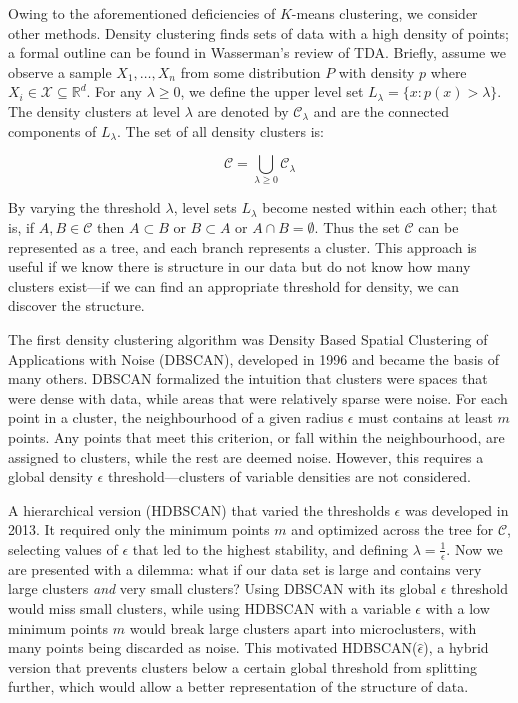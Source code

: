 Owing to the aforementioned deficiencies of $K$-means clustering, we consider other methods. Density clustering finds sets of data with a high density of points; a formal outline can be found in Wasserman's review of TDA\citep{wasserman_topological_2018}. Briefly, assume we observe a sample $X_{1}, \dots , X_{n}$ from some distribution $P$ with density $p$ where $X_{i} \in \mathcal{X} \subseteq \mathbb{R}^d$. For any $\lambda \ge 0$, we define the upper level set $L_{\lambda} = \{x: p(x) > \lambda \}$. The density clusters at level $\lambda$ are denoted by $\mathcal{C}_{\lambda}$ and are the connected components of $L_{\lambda}$. The set of all density clusters is:

$$ \mathcal{C} = \bigcup_{\lambda \ge 0} \mathcal{C}_{\lambda} $$

By varying the threshold $\lambda$, level sets $L_{\lambda}$ become nested within each other; that is, if $A, B \in \mathcal{C}$ then $A \subset B$ or $B \subset A$ or $A \cap B = \emptyset$. Thus the set $\mathcal{C}$ can be represented as a tree, and each branch represents a cluster. This approach is useful if we know there is structure in our data but do not know how many clusters exist---if we can find an appropriate threshold for density, we can discover the structure.

The first density clustering algorithm was Density Based Spatial Clustering of Applications with Noise (DBSCAN), developed in 1996\citep{ester1996density} and became the basis of many others\citep{khan_dbscan_2014}. DBSCAN formalized the intuition that clusters were spaces that were dense with data, while areas that were relatively sparse were noise. For each point in a cluster, the neighbourhood of a given radius $\epsilon$ must contains at least $m$ points. Any points that meet this criterion, or fall within the neighbourhood, are assigned to clusters, while the rest are deemed noise. However, this requires a global density $\epsilon$ threshold---clusters of variable densities are not considered. 

A hierarchical version (HDBSCAN) that varied the thresholds $\epsilon$ was developed in 2013\citep{campello_density-based_2013}. It required only the minimum points $m$ and optimized across the tree for $\mathcal{C}$, selecting values of $\epsilon$ that led to the highest stability, and defining $\lambda = \frac{1}{\epsilon}$. Now we are presented with a dilemma: what if our data set is large and contains very large clusters \emph{and} very small clusters? Using DBSCAN with its global $\epsilon$ threshold would miss small clusters, while using HDBSCAN with a variable $\epsilon$ with a low minimum points $m$ would break large clusters apart into microclusters, with many points being discarded as noise. This motivated HDBSCAN($\hat{\epsilon}$), a hybrid version that prevents clusters below a certain global threshold from splitting further, which would allow a better representation of the structure of data\citep{malzer_hybrid_2020}.

